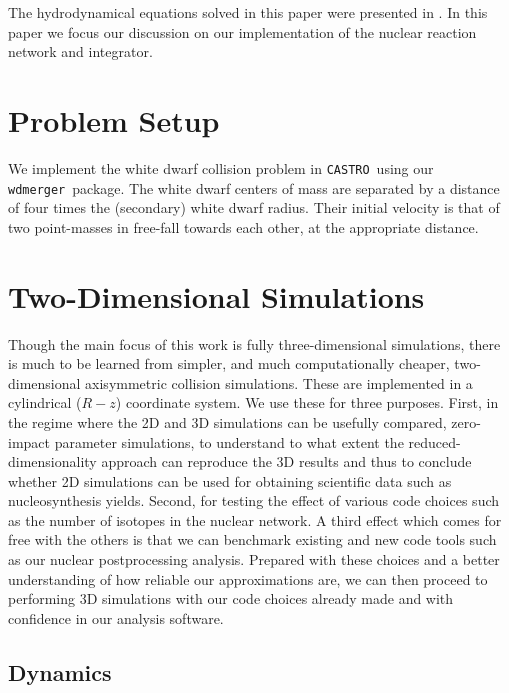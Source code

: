 \documentclass[twocolumn,numberedappendix]{../aastex6}
\newcommand{\castro}{\texttt{CASTRO}}
\newcommand{\wdmerger}{\texttt{wdmerger}}
\begin{document}
The hydrodynamical equations solved in this paper were presented in \citet{wdmergerI}.
In this paper we focus our discussion on our implementation of the nuclear
reaction network and integrator.

\section{Problem Setup}
\label{sec:problemsetup}

We implement the white dwarf collision problem in \castro\ using our \wdmerger\
package. The white dwarf centers of mass are separated by a distance of four times
the (secondary) white dwarf radius. Their initial velocity is that of
two point-masses in free-fall towards each other, at the appropriate distance.


\section{Two-Dimensional Simulations}
\label{sec:2D}

Though the main focus of this work is fully three-dimensional simulations,
there is much to be learned from simpler, and much computationally cheaper,
two-dimensional axisymmetric collision simulations. These are implemented
in a cylindrical ($R-z$) coordinate system. We use these for three purposes.
First, in the regime where the 2D and 3D simulations can be usefully compared, 
zero-impact parameter simulations, to understand to what extent the
reduced-dimensionality approach can reproduce the 3D results and thus to
conclude whether 2D simulations can be used for obtaining scientific data
such as nucleosynthesis yields. Second, for testing the effect of various
code choices such as the number of isotopes in the nuclear network. A third
effect which comes for free with the others is that we can benchmark existing
and new code tools such as our nuclear postprocessing analysis. Prepared
with these choices and a better understanding of how reliable our approximations
are, we can then proceed to performing 3D simulations with our code choices
already made and with confidence in our analysis software.

\subsection{Dynamics}
\label{sec:2D:dynamics}
\end{document}
